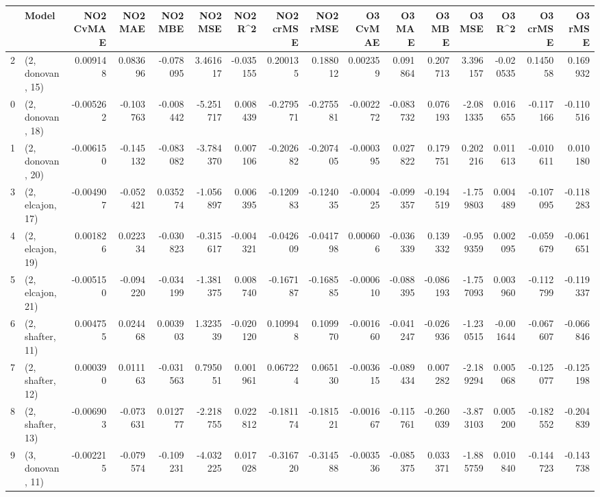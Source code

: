 \begin{tabular}{llrrrrrrrrrrrrrr}
\toprule
{} &             Model &  NO2 CvMAE &   NO2 MAE &   NO2 MBE &    NO2 MSE &   NO2 R\textasciicircum2 &  NO2 crMSE &  NO2 rMSE &  O3 CvMAE &    O3 MAE &    O3 MBE &     O3 MSE &    O3 R\textasciicircum2 &  O3 crMSE &   O3 rMSE \\
\midrule
2  &  (2, donovan, 15) &   0.009148 &  0.083696 & -0.078095 &   3.461617 & -0.035155 &   0.200135 &  0.188012 &  0.002359 &  0.091864 &  0.207713 &   3.396157 & -0.020535 &  0.145058 &  0.169932 \\
0  &  (2, donovan, 18) &  -0.005262 & -0.103763 & -0.008442 &  -5.251717 &  0.008439 &  -0.279571 & -0.275581 & -0.002272 & -0.083732 &  0.076193 &  -2.081335 &  0.016655 & -0.117166 & -0.110516 \\
1  &  (2, donovan, 20) &  -0.006150 & -0.145132 & -0.083082 &  -3.784370 &  0.007106 &  -0.202682 & -0.207405 & -0.000395 &  0.027822 &  0.179751 &   0.202216 &  0.011613 & -0.010611 &  0.010180 \\
3  &  (2, elcajon, 17) &  -0.004907 & -0.052421 &  0.035274 &  -1.056897 &  0.006395 &  -0.120983 & -0.124035 & -0.000425 & -0.099357 & -0.194519 &  -1.759803 &  0.004489 & -0.107095 & -0.118283 \\
4  &  (2, elcajon, 19) &   0.001826 &  0.022334 & -0.030823 &  -0.315617 & -0.004321 &  -0.042609 & -0.041798 &  0.000606 & -0.036339 &  0.139332 &  -0.959359 &  0.002095 & -0.059679 & -0.061651 \\
5  &  (2, elcajon, 21) &  -0.005150 & -0.094220 & -0.034199 &  -1.381375 &  0.008740 &  -0.167187 & -0.168585 & -0.000610 & -0.088395 & -0.086193 &  -1.757093 &  0.003960 & -0.112799 & -0.119337 \\
6  &  (2, shafter, 11) &   0.004755 &  0.024468 &  0.003903 &   1.323539 & -0.020120 &   0.109948 &  0.109970 & -0.001660 & -0.041247 & -0.026936 &  -1.230515 & -0.001644 & -0.067607 & -0.066846 \\
7  &  (2, shafter, 12) &   0.000390 &  0.011163 & -0.031563 &   0.795051 &  0.001961 &   0.067224 &  0.065130 & -0.003615 & -0.089434 &  0.007282 &  -2.189294 &  0.005068 & -0.125077 & -0.125198 \\
8  &  (2, shafter, 13) &  -0.006903 & -0.073631 &  0.012777 &  -2.218755 &  0.022812 &  -0.181174 & -0.181521 & -0.001667 & -0.115761 & -0.260039 &  -3.873103 &  0.005200 & -0.182552 & -0.204839 \\
9  &  (3, donovan, 11) &  -0.002215 & -0.079574 & -0.109231 &  -4.032225 &  0.017028 &  -0.316720 & -0.314588 & -0.003536 & -0.085375 &  0.033371 &  -1.885759 &  0.010840 & -0.144723 & -0.143738 \\

\end{tabular}
